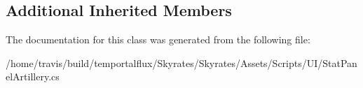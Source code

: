 \subsection*{Additional Inherited Members}


The documentation for this class was generated from the following file\-:\begin{DoxyCompactItemize}
\item 
/home/travis/build/temportalflux/\-Skyrates/\-Skyrates/\-Assets/\-Scripts/\-U\-I/Stat\-Panel\-Artillery.\-cs\end{DoxyCompactItemize}
